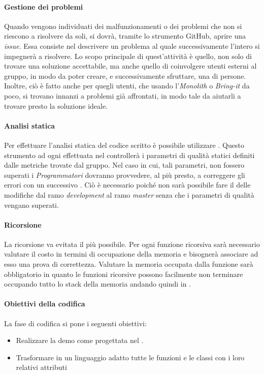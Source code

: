 \paragraph{Gestione dei problemi}

Quando vengono individuati dei malfunzionamenti o dei problemi che non si riescono a risolvere da soli, si dovrà, tramite lo strumento GitHub, aprire una \textit{issue}. Essa consiste nel descrivere un problema al quale successivamente l'intero  si impegnerà a risolvere. Lo scopo principale di quest'attività è quello, non solo di trovare una soluzione accettabile, ma anche quello di coinvolgere utenti esterni al gruppo, in modo da poter creare, e successivamente sfruttare, una  di persone. Inoltre, ciò è fatto anche per quegli utenti, che usando l'\textit{Monolith} o \textit{Bring-it} da poco, si trovano innanzi a problemi già affrontati, in modo tale da aiutarli a trovare presto la soluzione ideale.

\paragraph{Analisi statica}

Per effettuare l’analisi statica del codice scritto è possibile utilizzare . Questo strumento ad ogni  effettuata nel  controllerà i parametri di qualità statici definiti dalle metriche trovate dal gruppo. Nel caso in cui, tali parametri, non fossero superati i \textit{Programmatori} dovranno provvedere, al più presto, a correggere gli errori con un successivo . Ciò è necessario poiché non sarà possibile fare il  delle modifiche dal ramo \textit{development} al ramo \textit{master} senza che i parametri di qualità vengano superati.
  
\paragraph{Ricorsione}
La ricorsione va evitata il più possibile. Per ogni funzione ricorsiva sarà necessario valutare il costo in termini di occupazione della memoria e bisognerà associare ad esso una prova di correttezza.
Valutare la memoria occupata dalla funzione sarà obbligatorio in quanto le funzioni ricorsive possono facilmente non terminare occupando tutto lo stack della memoria andando quindi in .

\paragraph{Obiettivi della codifica}
La fase di codifica si pone i seguenti obiettivi:
\begin{itemize}
\item Realizzare la demo come progettata nel \DDP.
\item Trasformare in un linguaggio adatto tutte le funzioni e le classi con i loro relativi attributi 
\end{itemize}

